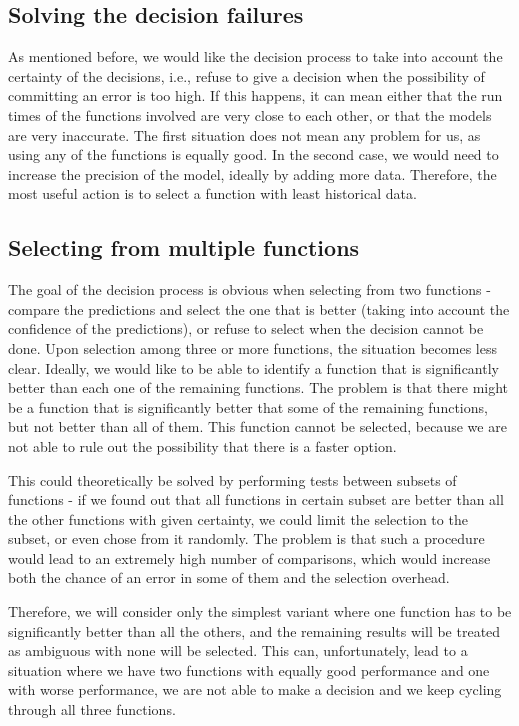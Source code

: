 \subsection{Solving the decision failures}
\label{subsec:solving_decision_failures}

As mentioned before, we would like the decision process to take into account the certainty of the decisions, i.e., refuse to give a decision when the possibility of committing an error is too high. If this happens, it can mean either that the run times of the functions involved are very close to each other, or that the models are very inaccurate. The first situation does not mean any problem for us, as using any of the functions is equally good. In the second case, we would need to increase the precision of the model, ideally by adding more data. Therefore, the most useful action is to select a function with least historical data. 

\subsection{Selecting from multiple functions}
\label{subsec:selecting_multiple_function}

The goal of the decision process is obvious when selecting from two functions - compare the predictions and select the one that is better (taking into account the confidence of the predictions), or refuse to select when the decision cannot be done. Upon selection among three or more functions, the situation becomes less clear. Ideally, we would like to be able to identify a function that is significantly better than each one of the remaining functions. The problem is that there might be a function that is significantly better that some of the remaining functions, but not better than all of them. This function cannot be selected, because we are not able to rule out the possibility that there is a faster option.

This could theoretically be solved by performing tests between subsets of functions - if we found out that all functions in certain subset are better than all the other functions with given certainty, we could limit the selection to the subset, or even chose from it randomly. The problem is that such a procedure would lead to an extremely high number of comparisons, which would increase both the chance of an error in some of them and the selection overhead.

Therefore, we will consider only the simplest variant where one function has to be significantly better than all the others, and the remaining results will be treated as ambiguous with none will be selected. This can, unfortunately, lead to a situation where we have two functions with equally good performance and one with worse performance, we are not able to make a decision and we keep cycling through all three functions.

